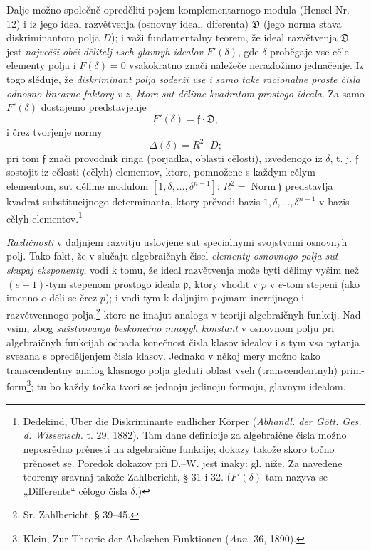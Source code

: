 \documentclass[11pt]{article}
\providecommand{\frD}{\mathfrak D}
\providecommand{\frf}{\mathfrak f}
\providecommand{\frp}{\mathfrak p}
\begin{document}
Dalje možno společně opreděliti pojem komplementarnogo modula (Hensel Nr. 12) i iz jego ideal razvětvenja (osnovny ideal, diferenta) \(\frD\) (jego norma stava diskriminantom polja \(D\)); i važi fundamentalny teorem, že ideal razvětvenja \(\frD\) jest {\itshape največši obči dělitelj vseh glavnyh idealov \(F'(\delta)\)}, gde \(\delta\) proběgaje vse cěle elementy polja i \(F(\delta)=0\) vsakokratno znači naležeče nerazložimo jednačenje. Iz togo slěduje, že {\itshape diskriminant polja soderži vse i samo take racionalne proste čisla odnosno linearne faktory v \(z\), ktore sut dělime kvadratom prostogo ideala}. Za samo \(F'(\delta)\) dostajemo predstavjenje
\[
F'(\delta)=\frf\cdot\frD,
\]
i črez tvorjenje normy
\[
\Delta(\delta)=R^2\cdot D;
\]
pri tom \(\frf\) znači provodnik ringa (porjadka, oblasti cělosti), izvedenogo iz \(\delta\), t. j. \(\frf\) sostojit iz cělosti (cělyh) elementov, ktore, pomnožene s každym cělym elementom, sut dělime modulom \([1,\delta,\ldots,\delta^{n-1}]\). \(R^2=\operatorname{Norm}\frf\) predstavlja kvadrat substitucijnogo determinanta, ktory prěvodi bazis \(1,\delta,\ldots,\delta^{n-1}\) v bazis cělyh elementov.\footnote{Dedekind, Über die Diskriminante endlicher Körper (\emph{Abhandl. der Gött. Ges. d. Wissensch.} t. 29, 1882). Tam dane definicije za algebraične čisla možno neposrědno prěnesti na algebraične funkcije; dokazy takože skoro točno prěnoset se. Poredok dokazov pri D.--W. jest inaky: gl. niže. Za navedene teoremy sravnaj takože Zahlbericht, § 31 i 32. (\(F'(\delta)\) tam nazyva se „Differente“ cělogo čisla \(\delta\).)}

{\itshape Različnosti} v daljnjem razvitju uslovjene sut specialnymi svojstvami osnovnyh polj. Tako fakt, že v slučaju algebraičnyh čisel {\itshape elementy osnovnogo polja sut skupaj eksponenty}, vodi k tomu, že ideal razvětvenja može byti dělimy vyšim než \((e-1)\)-tym stepenom prostogo ideala \(\frp\), ktory vhodit v \(p\) v \(e\)-tom stepeni (ako imenno \(e\) děli se črez \(p\)); i vodi tym k daljnjim pojmam inercijnogo i razvětvennogo polja,\footnote{Sr. Zahlbericht, § 39--45.} ktore ne imajut analoga v teoriji algebraičnyh funkcij. Nad vsim, zbog {\itshape sušstvovanja beskonečno mnogyh konstant} v osnovnom polju pri algebraičnyh funkcijah odpada konečnost čisla klasov idealov i s tym vsa pytanja svezana s opreděljenjem čisla klasov. Jednako v někoj mery možno kako transcendentny analog klasnogo polja gledati oblast vseh (transcendentnyh) prim-form\footnote{Klein, Zur Theorie der Abelschen Funktionen (\emph{Ann.} 36, 1890).}; tu bo každy točka tvori se jednoju jedinoju formoju, glavnym idealom.
\end{document}
